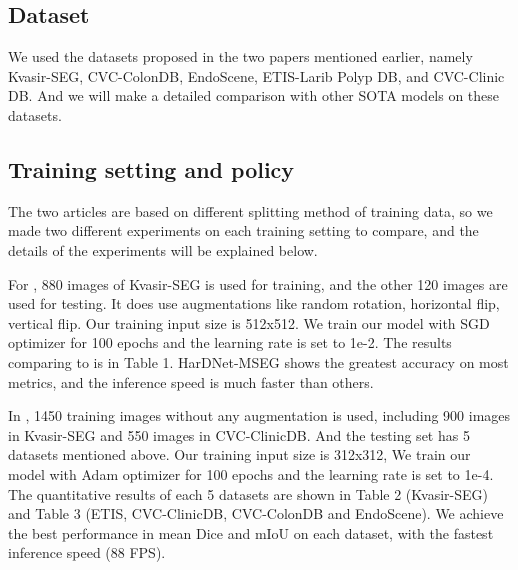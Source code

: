 \documentclass{article}
\begin{document}
\subsection{Dataset }
    \vspace{4mm}
    \hspace*{0.5cm}We used the datasets proposed in the two papers mentioned earlier, namely Kvasir-SEG, CVC-ColonDB,  EndoScene, ETIS-Larib Polyp DB, and CVC-Clinic DB. And we will make a detailed comparison with other SOTA models on these datasets.
    
\subsection{Training setting and policy}
\vspace{4mm}
\hspace*{0.5cm}The two articles are based on different splitting method of training data, so we made two different experiments on each training setting to compare, and the details of the experiments will be explained below.

    \vspace{4mm}
    For \cite{jha2020real}, 880 images of Kvasir-SEG is used for training, and the other 120 images are used for testing. It does use augmentations like random rotation, horizontal flip, vertical flip. Our training input size is 512x512. We train our model with SGD optimizer for 100 epochs and the learning rate is set  to 1e-2. The results comparing to \cite{jha2020real} is in Table 1. HarDNet-MSEG shows the greatest accuracy on most metrics, and the inference speed is much faster than others. 

    \vspace{4mm}
    In \cite{pranet}, 1450 training images without any augmentation is used, including 900 images in Kvasir-SEG and 550 images in CVC-ClinicDB. And the testing set has 5 datasets mentioned above. Our training input size is 312x312, We train our model with Adam optimizer for 100 epochs and the learning rate is set to 1e-4. The quantitative results of each 5 datasets are shown in Table 2 (Kvasir-SEG) and Table 3 (ETIS, CVC-ClinicDB, CVC-ColonDB and EndoScene). We achieve the best performance in mean Dice and mIoU on each dataset, with the fastest inference speed (88 FPS).
\end{document}
